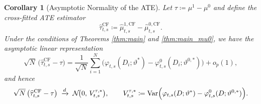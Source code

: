 \documentclass{article}
\newtheorem{corollary}[theorem]{Corollary}
\begin{document}
\begin{corollary}[Asymptotic Normality of the ATE]\label{cor:ate}
Let $\tau\coloneqq \mu^1-\mu^0$ and define the cross-fitted ATE estimator
\[
\widehat{\tau}^{\mathrm{CF}}_{t,s}\coloneqq \widehat{\mu}^{1,\mathrm{CF}}_{t,s}-\widehat{\mu}^{0,\mathrm{CF}}_{t,s}.
\]
Under the conditions of Theorems \ref{thm:main} and \ref{thm:main_mu0}, we have the asymptotic linear representation
\[
\sqrt{N}\,\big(\widehat{\tau}^{\mathrm{CF}}_{t,s}-\tau\big)
=
\frac{1}{\sqrt{N}}\sum_{i=1}^N
\Big(
\varphi_{t,s}(D_i;\vartheta^*)
-
\varphi^{0}_{t,s}(D_i;\vartheta^{0,*})
\Big)
+o_p(1),
\]
and hence
\[
\sqrt{N}\,\big(\widehat{\tau}^{\mathrm{CF}}_{t,s}-\tau\big)
\;\xrightarrow{d}\;
\mathcal{N}\!\big(0,\,V^{\tau,*}_{t,s}\big),
\qquad
V^{\tau,*}_{t,s}\coloneqq \operatorname{Var}\!\Big(\varphi_{t,s}(D;\vartheta^*)-\varphi^{0}_{t,s}(D;\vartheta^{0,*})\Big).
\]
\end{corollary}
\end{document}
